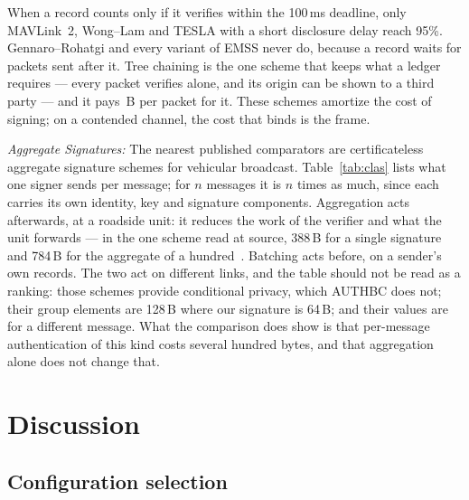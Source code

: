 \documentclass[lineno,pdflatex,sn-mathphys-num]{sn-jnl}
\newcommand{\runin}[1]{\textit{#1:}}
\renewcommand{\_}{\authbcunderscore\allowbreak}
\begin{document}
When a record counts only if it verifies within the 100\,ms deadline, only
MAVLink~2, Wong--Lam and TESLA with a short disclosure delay reach 95\%. Gennaro--Rohatgi and
every variant of EMSS never do, because a record waits for packets sent after it. Tree chaining
is the one scheme that keeps what a ledger requires --- every packet verifies alone, and its
origin can be shown to a third party --- and it pays \strAuthWl\,B per packet for it. These schemes
amortize the cost of signing; on a contended channel, the cost that binds is the frame.

\runin{Aggregate Signatures} The nearest published comparators are certificateless aggregate
signature schemes for vehicular broadcast. Table~\ref{tab:clas} lists what one signer sends per
message; for $n$ messages it is $n$ times as much, since each carries its own identity, key and
signature components. Aggregation acts afterwards, at a roadside unit: it reduces the work of the
verifier and what the unit forwards --- in the one scheme read at source, 388\,B for a single
signature and 784\,B for the aggregate of a hundred~\cite{wang2022clas}. Batching acts before, on
a sender's own records. The two act on different links, and the table should not be read as
a ranking: those schemes provide conditional privacy, which AUTHBC does not; their group elements
are 128\,B where our signature is 64\,B; and their values are for a different message. What the
comparison does show is that per-message authentication of this kind costs several hundred
bytes, and that aggregation alone does not change that.

\section{Discussion}\label{sec:discussion}

\subsection{Configuration selection}
\end{document}
